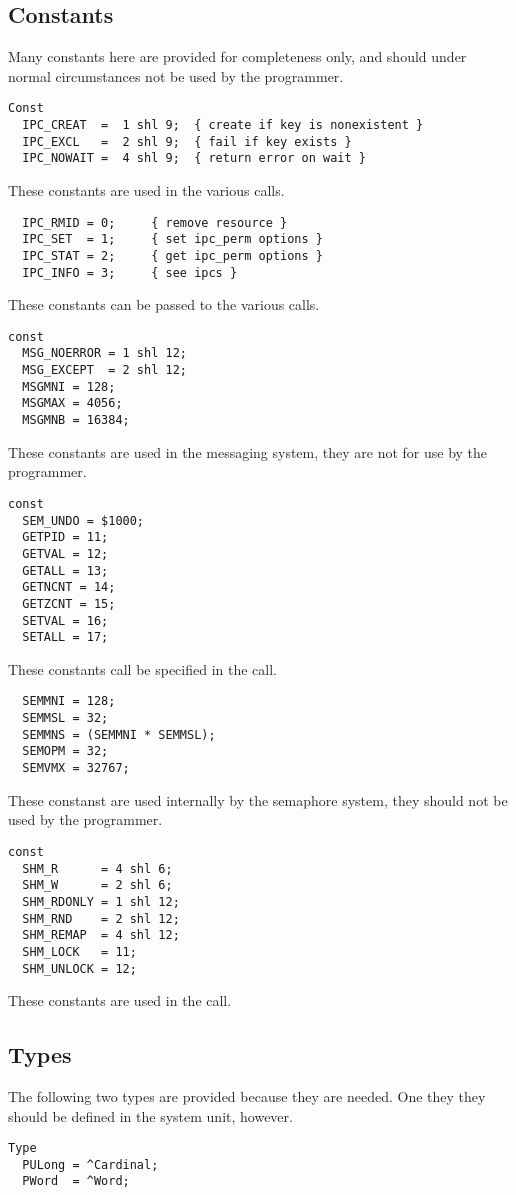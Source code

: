 \subsection{Constants}
Many constants here are provided for completeness only, and should under
normal circumstances not be used by the programmer.
\begin{verbatim}
Const 
  IPC_CREAT  =  1 shl 9;  { create if key is nonexistent }
  IPC_EXCL   =  2 shl 9;  { fail if key exists }
  IPC_NOWAIT =  4 shl 9;  { return error on wait }
\end{verbatim}
These constants are used in the various  calls.
\begin{verbatim}
  IPC_RMID = 0;     { remove resource }
  IPC_SET  = 1;     { set ipc_perm options }
  IPC_STAT = 2;     { get ipc_perm options }
  IPC_INFO = 3;     { see ipcs }
\end{verbatim}
These constants can be passed to the various  calls.
\begin{verbatim}
const
  MSG_NOERROR = 1 shl 12;
  MSG_EXCEPT  = 2 shl 12;
  MSGMNI = 128;
  MSGMAX = 4056;
  MSGMNB = 16384;
\end{verbatim}
These constants are used in the messaging system, they are not for use by
the programmer.
\begin{verbatim}
const
  SEM_UNDO = $1000;
  GETPID = 11;
  GETVAL = 12;
  GETALL = 13;
  GETNCNT = 14;
  GETZCNT = 15;
  SETVAL = 16;
  SETALL = 17;
\end{verbatim}
These constants call be specified in the  call.
\begin{verbatim}
  SEMMNI = 128;
  SEMMSL = 32;
  SEMMNS = (SEMMNI * SEMMSL);
  SEMOPM = 32;
  SEMVMX = 32767;
\end{verbatim}
These constanst are used internally by the semaphore system, they should not
be used by the programmer.
\begin{verbatim}
const
  SHM_R      = 4 shl 6;
  SHM_W      = 2 shl 6;
  SHM_RDONLY = 1 shl 12;
  SHM_RND    = 2 shl 12;
  SHM_REMAP  = 4 shl 12;
  SHM_LOCK   = 11;
  SHM_UNLOCK = 12;
\end{verbatim}
These constants are used in the  call.

\subsection{Types}
The following two types are provided because they are needed. One they they
should be defined in the system unit, however.
\begin{verbatim}
Type
  PULong = ^Cardinal;
  PWord  = ^Word;
\end{verbatim}

